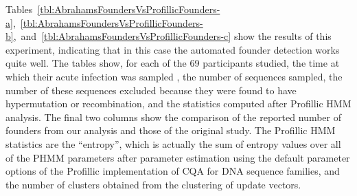 \documentclass[preprint,12pt,authoryear]{elsarticle}
\begin{document}
Tables~\ref{tbl:AbrahamsFoundersVsProfillicFounders-a},~\ref{tbl:AbrahamsFoundersVsProfillicFounders-b},~and~\ref{tbl:AbrahamsFoundersVsProfillicFounders-c} show the results of this experiment, indicating that in this case the automated founder detection works quite well. The tables show, for each of the 69 participants studied, the time at which their acute infection was sampled \citep[as Fiebig stages][]{fiebig2003dynamics}, the number of sequences sampled, the number of these sequences excluded because they were found to have hypermutation or recombination, and the statistics computed after Profillic HMM analysis.  The final two columns show the comparison of the reported number of founders from our analysis and those of the original study.  The Profillic HMM statistics are the ``entropy'', which is actually the sum of entropy values over all of the PHMM parameters after parameter estimation using the default parameter options of the Profillic implementation of CQA for DNA sequence families, and the number of clusters obtained from the clustering of update vectors.
\end{document}
